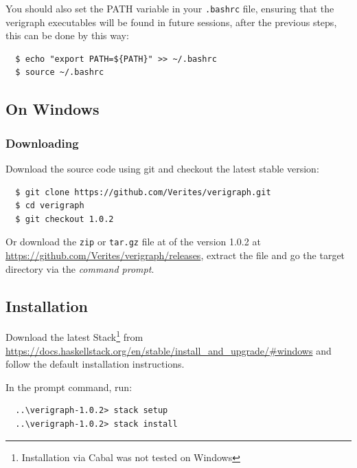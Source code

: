 \documentclass[12pt]{article}
\begin{document}
You should also set the PATH variable in your \texttt{.bashrc} file, ensuring that the verigraph executables will be found in future sessions, after the previous steps, this can be done by this way:

\begin{verbatim}
  $ echo "export PATH=${PATH}" >> ~/.bashrc
  $ source ~/.bashrc
\end{verbatim}

\subsection{On Windows}

\subsubsection{Downloading}
Download the source code using git and checkout the latest stable version:
\begin{verbatim}
  $ git clone https://github.com/Verites/verigraph.git
  $ cd verigraph
  $ git checkout 1.0.2
\end{verbatim}

\noindent
Or download the \texttt{zip} or \texttt{tar.gz} file at of the version 1.0.2 at \url{https://github.com/Verites/verigraph/releases}, extract the file and go the target directory via the \emph{command prompt}.

\subsection{Installation}

Download the latest Stack\footnote{Installation via Cabal was not tested on Windows} from \url{https://docs.haskellstack.org/en/stable/install_and_upgrade/#windows} and follow the default installation instructions.

In the prompt command, run:

\begin{verbatim}
  ..\verigraph-1.0.2> stack setup 
  ..\verigraph-1.0.2> stack install
\end{verbatim}


\end{document}
